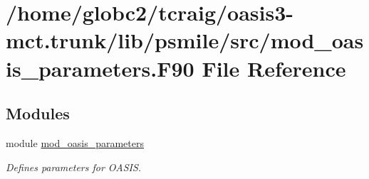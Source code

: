 \hypertarget{mod__oasis__parameters_8_f90}{}\section{/home/globc2/tcraig/oasis3-\/mct.trunk/lib/psmile/src/mod\+\_\+oasis\+\_\+parameters.F90 File Reference}
\label{mod__oasis__parameters_8_f90}
\subsection*{Modules}
\begin{DoxyCompactItemize}
\item 
module \hyperlink{namespacemod__oasis__parameters}{mod\+\_\+oasis\+\_\+parameters}
\begin{DoxyCompactList}\small\item\em Defines parameters for O\+A\+S\+IS. \end{DoxyCompactList}\end{DoxyCompactItemize}
